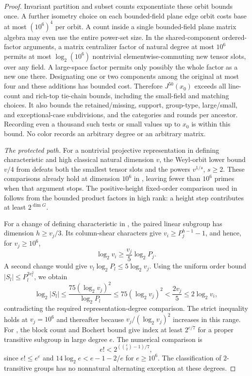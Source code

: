 \begin{proof}
Invariant partition and subset counts exponentiate these orbit bounds
once.  A further isometry choice on each bounded-field plane edge orbit
costs base at most $(10^6)^4$ per orbit.  A count inside a single
bounded-field plane matrix algebra may even use the entire power-set
size.  In the shared-component ordered-factor arguments, a matrix
centralizer factor of natural degree at most $10^6$ permits at most
$\log_2(10^6)$ nontrivial elementwise-commuting new tensor slots, over
any field.  A large-space factor permits only possibly the whole factor
as a new one there.  Designating one or two components among the
original at most four and these additions has bounded cost.  Therefore
$J^{50}(x_0)$ exceeds all line-count and rich-top tie-chain bounds,
including the small-field and matching choices.  It also bounds the
retained/missing, support, group-type, large/small, and exceptional-case
subdivisions, and the categories and rounds per ancestor.  Recording
even a thousand such tests or small values up to $x_0$ is within this
bound.  No color records an arbitrary degree or an arbitrary matrix.

\emph{The protected path.}
For a nontrivial projective representation in defining characteristic
and high classical natural dimension $v$, the Weyl-orbit lower bound
$v/4$ from  defeats both the smallest tensor slots
and the powers $v^{1/s}$, $s\ge2$.  These comparisons already hold at
dimension $10^6$ in , leaving fewer than
$10^6$ primes when that argument stops.  The positive-height fixed-order
comparison used in  follows from the bounded product
factors in high rank: a height step contributes at least $2^{\dim G}$.

For a change of defining characteristic in ,
the paired linear subgroup has dimension $h\ge v_j/3$.  Its column-shear
characters give $v_i\ge P_j^{h-1}-1$, and hence, for $v_j\ge10^6$,
\begin{equation}\label{q:characteristic-change}
 \log_2v_i\ge\frac{v_j}{5}\log_2P_j.
\end{equation}
A second change would give $v_l\log_2P_l\le5\log_2v_j$.
Using the uniform order bound $|S_l|\le P_l^{3v_l^2}$, we obtain
\[
 \log_2|S_l|\le
 \frac{75(\log_2v_j)^2}{\log_2P_l}
 \le75(\log_2v_j)^2<\frac{2v_j}{5}\le2\log_2v_i,
\]
contradicting the required representation-degree comparison.  The strict
inequality holds at $v_j=10^6$ and thereafter because
$v_j/(\log_2v_j)^2$ increases in this range.  For
, the block count and Bochert bound give index
at least $2^{e/7}$ for a proper transitive subgroup in large degree $e$.
The numerical comparison is
\[
                       e!<2^{(\binom e2-1)/7},
\]
since $e!\le e^e$ and $14\log_2e<e-1-2/e$ for $e\ge10^6$.
The classification of $2$-transitive groups has no nonnatural
alternating exception at these degrees.


\end{proof}
